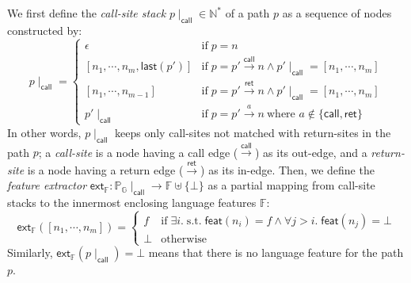 \documentclass[acmsmall,review,screen]{acmart}
\newcommand{\tif}{\text{if} \; }
\newcommand{\telse}{\text{otherwise}}
\newcommand{\tst}{{\; \text{s.t.} \; }}
\newcommand{\name}[1]{\textsf{#1}}
\newcommand{\graph}{\mathbb{G}}
\newcommand{\nodeset}{\mathbb{N}}
\newcommand{\node}{n}
\newcommand{\edge}[1]{\xrightarrow{#1}}
\newcommand{\call}{\edge{\name{call}}}
\newcommand{\ret}{\edge{\name{ret}}}
\newcommand{\annot}{a}
\newcommand{\patset}[1]{\mathbb{P}_{#1}}
\newcommand{\pat}{p}
\newcommand{\getlast}{\name{last}}
\newcommand{\featset}{\mathbb{F}}
\newcommand{\feat}{f}
\newcommand{\featmap}{\name{feat}}
\newcommand{\extfeat}{\name{ext}_\featset}
\newcommand{\css}[1]{{#1}\!\mid_{\name{call}}}
\begin{document}
We first define the \textit{call-site stack} $\css{\pat} \in \nodeset^*$ of a
path $\pat$ as a sequence of nodes constructed by:
\begin{equation}\label{equ:css}
  \css{\pat} = \left\{
    \begin{array}{ll}
      \epsilon &
      \tif \pat = \node\\

      {[\node_1, \cdots, \node_m, \getlast(\pat')]} &
      \tif \pat = \pat' \call \node \wedge
      \css{\pat'} = [\node_1, \cdots, \node_m]\\

      {[\node_1, \cdots, \node_{m-1}]} &
      \tif \pat = \pat' \ret \node \wedge
      \css{\pat'} = [\node_1, \cdots, \node_m]\\

      \css{\pat'} &
      \tif \pat = \pat' \edge{\annot} \node\ \mbox{where } \annot
                    \not\in \{ \name{call}, \name{ret} \}

    \end{array}
  \right.
\end{equation}
In other words, $\css{\pat}$ keeps only call-sites not matched with return-sites
in the path $\pat$;  a \textit{call-site} is a node having a call edge ($\call$)
as its out-edge, and a \textit{return-site} is a node having a return edge
($\ret$) as its in-edge.
%
Then, we define the \textit{feature extractor} $\extfeat: \css{\patset{\graph}}
\rightarrow \featset \uplus \{ \bot \}$ as a partial mapping from call-site
stacks to the innermost enclosing language features $\featset$:
\begin{equation}\label{equ:extfeat}
  \extfeat([\node_1, \cdots, \node_m]) = \left\{
    \begin{array}{ll}
      \feat & \tif
      \exists i. \tst \featmap(\node_i) = \feat \wedge
      \forall j > i. \; \featmap(\node_j) = \bot
      \\

      \bot & \telse
    \end{array}
  \right.
\end{equation}
%
Similarly, $\extfeat(\css{\pat}) = \bot$ means that there is no language feature
for the path $\pat$.

\end{document}
